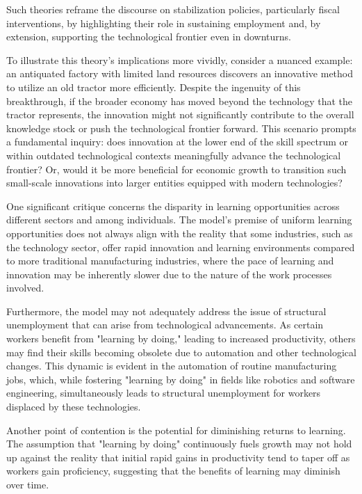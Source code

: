 \documentclass[12pt]{article}
\begin{document}
Such theories reframe the discourse on stabilization policies, particularly fiscal interventions, by highlighting their
role in sustaining employment and, by extension, supporting the technological frontier even in downturns. 

To illustrate this theory's implications more vividly, consider a nuanced example: an antiquated factory with limited
land resources discovers an innovative method to utilize an old tractor more efficiently. Despite the ingenuity of this
breakthrough, if the broader economy has moved beyond the technology that the tractor represents, the innovation might
not significantly contribute to the overall knowledge stock or push the technological frontier forward. This scenario
prompts a fundamental inquiry: does innovation at the lower end of the skill spectrum or within outdated technological
contexts meaningfully advance the technological frontier? Or, would it be more beneficial for economic growth to
transition such small-scale innovations into larger entities equipped with modern technologies? 

One significant critique concerns the disparity in learning opportunities across different sectors and among
individuals. The model's premise of uniform learning opportunities does not always align with the reality that some
industries, such as the technology sector, offer rapid innovation and learning environments compared to more traditional
manufacturing industries, where the pace of learning and innovation may be inherently slower due to the nature of the
work processes involved.

Furthermore, the model may not adequately address the issue of structural unemployment that can arise from technological
advancements. As certain workers benefit from "learning by doing," leading to increased productivity, others may find
their skills becoming obsolete due to automation and other technological changes. This dynamic is evident in the
automation of routine manufacturing jobs, which, while fostering "learning by doing" in fields like robotics and
software engineering, simultaneously leads to structural unemployment for workers displaced by these technologies.

Another point of contention is the potential for diminishing returns to learning. The assumption that "learning by
doing" continuously fuels growth may not hold up against the reality that initial rapid gains in productivity tend to
taper off as workers gain proficiency, suggesting that the benefits of learning may diminish over time.
\end{document}

